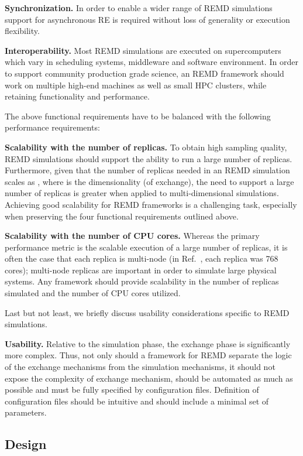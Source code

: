 \documentclass{sig-alternate-05-2015}
\begin{document}
\textbf{Synchronization.} In order to enable a wider range of REMD simulations support for asynchronous RE is required without loss of generality or execution flexibility. 



\textbf{Interoperability.} Most REMD simulations are executed on supercomputers which vary in scheduling systems, middleware and software environment. In order to support community production grade science, an REMD framework should work on multiple high-end machines as well as small HPC clusters, while retaining functionality and performance.

The above functional requirements have to be balanced with the following performance requirements:

\textbf{Scalability with the number of replicas.} To obtain high sampling quality, REMD simulations should support the ability to run a large number of replicas. Furthermore, given that the number of replicas needed in an REMD simulation scales as , where  is the dimensionality (of exchange), the need to support a large number of replicas is greater when applied to multi-dimensional simulations. Achieving good scalability for REMD frameworks is a challenging task, especially when preserving the four functional requirements outlined above.

\textbf{Scalability with the number of CPU cores.}  Whereas the primary performance metric is the scalable execution of a large number of replicas, it is often the case that each replica is multi-node (in Ref.~\cite{swadling2015structure}, each replica was 768 cores); multi-node replicas are important in order to simulate large physical systems.  Any framework should provide scalability in the number of replicas simulated and the number of CPU cores utilized.


Last but not least, we briefly discuss usability considerations specific to REMD simulations.
  
\textbf{Usability.} Relative to the simulation phase, the exchange phase is significantly more complex. Thus, not only should a framework for REMD separate the logic of the exchange mechanisms from the simulation mechanisms, it should not expose the complexity of exchange mechanism, should be automated as much as possible and must be fully specified by configuration files. Definition of configuration files should be intuitive and should include a minimal set of parameters.

\subsection{Design} \label{design} 
\end{document}

